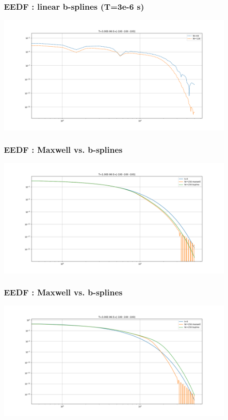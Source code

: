 \documentclass[mathserif, aspectratio=169]{beamer}
\begin{document}
\begin{frame}
	\frametitle{EEDF : linear b-splines (T=3e-6 s)}
	\begin{center}
		\includegraphics[width=0.9\textwidth]{figures/g0_3_bspline_eedf_conv.png}
	\end{center}
\end{frame}


\begin{frame}
	\frametitle{EEDF : Maxwell vs. b-splines}
	\begin{center}
		\includegraphics[width=0.9\textwidth]{figures/g0_1_bspline_vs_maxwell.png}
	\end{center}
\end{frame}

\begin{frame}
	\frametitle{EEDF : Maxwell vs. b-splines}
	\begin{center}
		\includegraphics[width=0.9\textwidth]{figures/g0_3_bspline_vs_maxwell.png}
	\end{center}
\end{frame}





\end{document}
